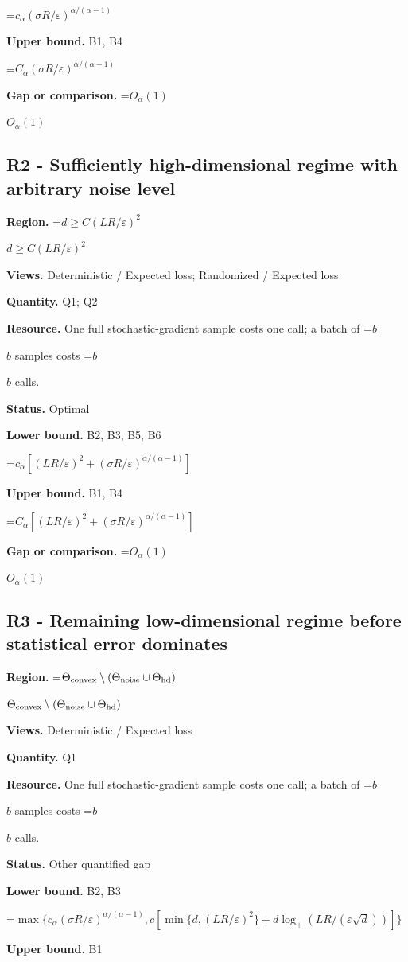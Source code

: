 \documentclass[10pt,a4paper]{article}
\newcommand{\AtlasMath}[1]{\par\begingroup\centering\setbox0=\hbox{$\displaystyle #1$}\ifdim\wd0>1.4\linewidth\typeout{ATLAS WIDE FORMULA: \the\wd0}\fi\ifdim\wd0>\linewidth\resizebox{\linewidth}{!}{\box0}\else\box0\fi\par\endgroup}
\newcommand{\AtlasInlineMath}[1]{\begingroup\setbox0=\hbox{$#1$}\ifdim\wd0>.4\linewidth\endgroup\AtlasMath{#1}\else\endgroup$#1$\fi}
\begin{document}
\AtlasMath{c_\alpha (\sigma R/\varepsilon)^{\alpha/(\alpha-1)}}
\textbf{Upper bound.} B1, B4

\AtlasMath{C_\alpha (\sigma R/\varepsilon)^{\alpha/(\alpha-1)}}
\textbf{Gap or comparison.} \AtlasInlineMath{O_\alpha(1)}

\subsection{R2 - Sufficiently high-dimensional regime with arbitrary noise level}
\textbf{Region.} \AtlasInlineMath{d\ge C (LR/\varepsilon)^2}

\textbf{Views.} Deterministic / Expected loss; Randomized / Expected loss

\textbf{Quantity.} Q1; Q2

\textbf{Resource.} One full stochastic-gradient sample costs one call; a batch of \AtlasInlineMath{b} samples costs \AtlasInlineMath{b} calls.

\textbf{Status.} Optimal

\textbf{Lower bound.} B2, B3, B5, B6

\AtlasMath{c_\alpha[(LR/\varepsilon)^2+(\sigma R/\varepsilon)^{\alpha/(\alpha-1)}]}
\textbf{Upper bound.} B1, B4

\AtlasMath{C_\alpha[(LR/\varepsilon)^2+(\sigma R/\varepsilon)^{\alpha/(\alpha-1)}]}
\textbf{Gap or comparison.} \AtlasInlineMath{O_\alpha(1)}

\subsection{R3 - Remaining low-dimensional regime before statistical error dominates}
\textbf{Region.} \AtlasInlineMath{\Theta_{\rm convex}\setminus(\Theta_{\rm noise}\cup\Theta_{\rm hd})}

\textbf{Views.} Deterministic / Expected loss

\textbf{Quantity.} Q1

\textbf{Resource.} One full stochastic-gradient sample costs one call; a batch of \AtlasInlineMath{b} samples costs \AtlasInlineMath{b} calls.

\textbf{Status.} Other quantified gap

\textbf{Lower bound.} B2, B3

\AtlasMath{\max\{c_\alpha (\sigma R/\varepsilon)^{\alpha/(\alpha-1)},c[\min\{d,(LR/\varepsilon)^2\}+d\log_+(LR/(\varepsilon\sqrt d))]\}}
\textbf{Upper bound.} B1
\end{document}

